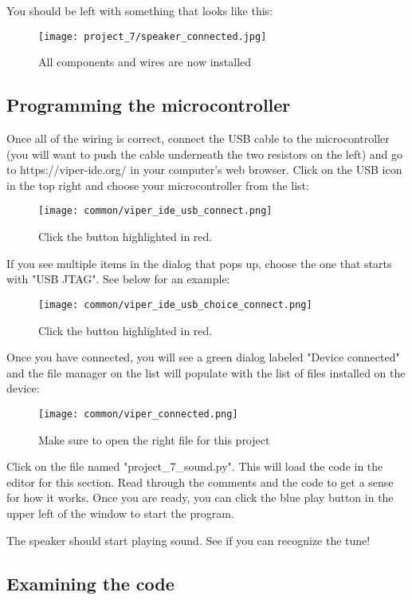 You should be left with something that looks like this:
\begin{figure}[H]
    \centering
    \texttt{[image: project\_7/speaker\_connected.jpg]}
    \caption{All components and wires are now installed}
\end{figure}

\subsection{Programming the microcontroller}
Once all of the wiring is correct, connect the USB cable to the microcontroller (you will want to push the cable underneath the
two resistors on the left) and go to https://viper-ide.org/ in your computer's web browser. Click on the USB icon in the top
right and choose your microcontroller from the list:

\begin{figure}[H]
    \centering
    \texttt{[image: common/viper\_ide\_usb\_connect.png]}
    \caption{Click the button highlighted in red.}
\end{figure}

If you see multiple items in the dialog that pops up, choose the one that starts with "USB JTAG". See below for an example:
\begin{figure}[H]
    \centering
    \texttt{[image: common/viper\_ide\_usb\_choice\_connect.png]}
    \caption{Click the button highlighted in red.}
\end{figure}

Once you have connected, you will see a green dialog labeled "Device connected" and the file manager on the list
will populate with the list of files installed on the device:
\begin{figure}[H]
    \centering
    \texttt{[image: common/viper\_connected.png]}
    \caption{Make sure to open the right file for this project}
\end{figure}

Click on the file named "project\_7\_sound.py". This will load the code in the editor for this section. Read through the comments
and the code to get a sense for how it works. Once you are ready, you can click the blue play button in the upper left of the window
to start the program.

The speaker should start playing sound. See if you can recognize the tune!

\subsection{Examining the code}

